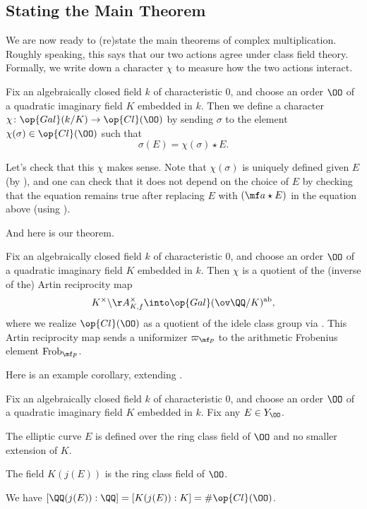 \documentclass[../notes.tex]{subfiles}
\begin{document}
\subsection{Stating the Main Theorem}
We are now ready to (re)state the main theorems of complex multiplication. Roughly speaking, this says that our two actions agree under class field theory. Formally, we write down a character $\chi$ to measure how the two actions interact.
\begin{notation}
	Fix an algebraically closed field $k$ of characteristic $0$, and choose an order $\OO$ of a quad\-ratic imaginary field $K$ embedded in $k$. Then we define a character $\chi\colon\op{Gal}(k/K)\to\op{Cl}(\OO)$ by sending $\sigma$ to the element $\chi(\sigma)\in\op{Cl}(\OO)$ such that
	\[\sigma(E)=\chi(\sigma)\star E.\]
\end{notation}
\begin{remark}
	Let's check that this $\chi$ makes sense. Note that $\chi(\sigma)$ is uniquely defined given $E$ (by ), and one can check that it does not depend on the choice of $E$ by checking that the equation remains true after replacing $E$ with $(\mf a\star E)$ in the equation above (using ).
\end{remark}
And here is our theorem.
\begin{theorem}[Main] \label{thm:main-cm}
	Fix an algebraically closed field $k$ of characteristic $0$, and choose an order $\OO$ of a quad\-ratic imaginary field $K$ embedded in $k$. Then $\chi$ is a quotient of the (inverse of the) Artin reciprocity map
	\[K^\times\backslash\AA_{K,f}^\times\into\op{Gal}(\ov\QQ/K)^{\mathrm{ab}},\]
	where we realize $\op{Cl}(\OO)$ as a quotient of the idele class group via . This Artin reciprocity map sends a uniformizer $\varpi_{\mf p}$ to the arithmetic Frobenius element $\mathrm{Frob}_{\mf p}$.
\end{theorem}
Here is an example corollary, extending .
\begin{corollary}
	Fix an algebraically closed field $k$ of characteristic $0$, and choose an order $\OO$ of a quad\-ratic imaginary field $K$ embedded in $k$. Fix any $E\in Y_\OO$.
	\begin{listalph}
		\item The elliptic curve $E$ is defined over the ring class field of $\OO$ and no smaller extension of $K$.
		\item The field $K(j(E))$ is the ring class field of $\OO$.
		\item We have $[\QQ(j(E)):\QQ]=[K(j(E)):K]=\#\op{Cl}(\OO)$.
	\end{listalph}
\end{corollary}
\end{document}
